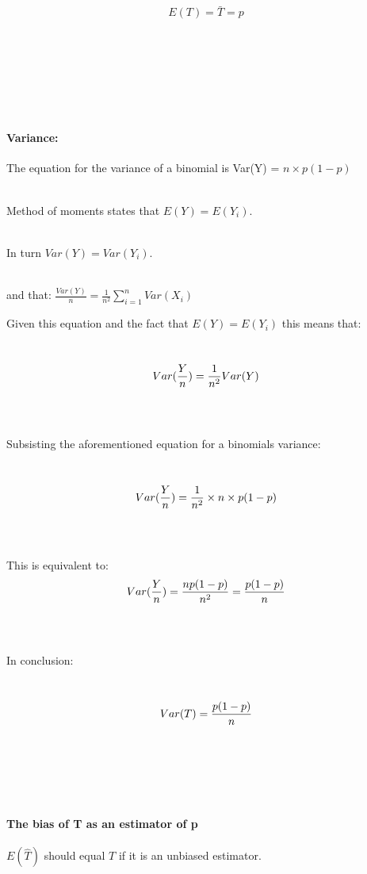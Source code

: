 \documentclass[
]{article}
\begin{document}
\[
E(T)= \bar{T} = p
\]\\
\strut \\
\strut \\
\strut \\

\paragraph{Variance:}\label{variance}

\hfill\break

The equation for the variance of a binomial is Var(Y) =
\(n \times p(1-p)\)\\
\strut \\
Method of moments states that \(E(Y) = E(Y_i)\).\\
\strut \\
In turn \(Var(Y) = Var(Y_i)\).\\
\strut \\
and that: \(\frac{Var(Y)}{n} = \frac{1}{n^2}\sum_{i=1}^nVar(X_i)\)

Given this equation and the fact that \(E(Y) = E(Y_i)\) this means
that:\\
\strut \\
\[
\Large
Var(\frac{Y}{n})=\frac{1}{n^2}Var(Y)
\]\\
\strut \\
Subsisting the aforementioned equation for a binomials variance:\\
\strut \\
\[
\Large
Var(\frac{Y}{n})=\frac{1}{n^2}\times n \times p(1-p) 
\]\\
\strut \\
This is equivalent to:\\
\[
\Large
Var(\frac{Y}{n})=\frac{np(1-p)}{n^2} =  \frac{p(1-p)}{n}
\]\\
\strut \\
In conclusion:\\
\strut \\
\[
\Large
Var(T) = \frac{p(1-p)}{n}
\]\\
\strut \\
\strut \\

\paragraph{The bias of T as an estimator of
p}\label{the-bias-of-t-as-an-estimator-of-p}

\(E(\hat{T})\) should equal \(T\) if it is an unbiased estimator.
\end{document}
